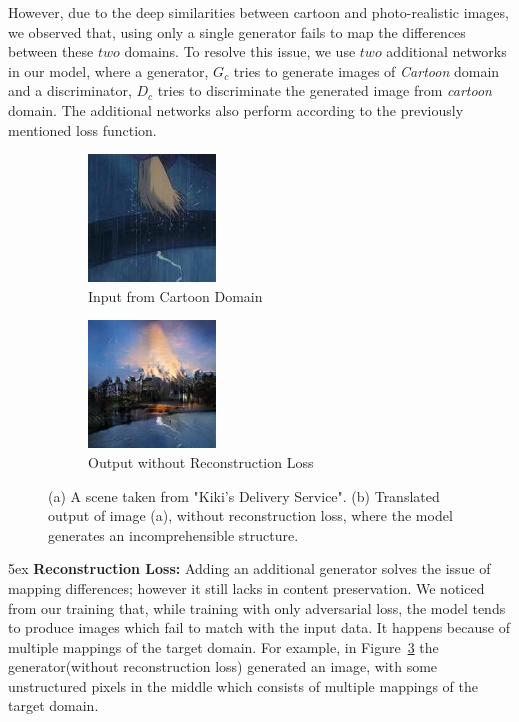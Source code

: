 \documentclass[conference]{IEEEtran}
\begin{document}
However, due to the deep similarities between cartoon and photo-realistic images, we observed that, using only a single generator fails to map the differences between these $two$ domains. To resolve this issue, we use $two$ additional networks in our model, where a generator, $G_c$ tries to generate images of \textit{Cartoon} domain and a discriminator, $D_c$ tries to discriminate the generated image from \textit{cartoon} domain. The additional networks also perform according to the previously mentioned loss function.\\ %
\begin{figure}[!htb]
    \centering
    \begin{subfigure}[b]{0.2\textwidth}
        \centering
        \includegraphics[scale=0.7]{Intro_pic/kds_real.png}
        \caption{Input from Cartoon Domain}
        \label{subfig: rc_1}
    \end{subfigure}
    \hspace{0.1in}
    \begin{subfigure}[b]{0.2\textwidth}
        \centering
        \includegraphics[scale=0.7]{Intro_pic/kds_fake.png}
        \caption{Output without Reconstruction Loss}
        \label{subfig:rc_2}
    \end{subfigure}
    \caption{(a) A scene taken from "Kiki's Delivery Service". (b) Translated output of image (a), without reconstruction loss, where the model generates an incomprehensible structure.}
    \label{fig:rc_loss}
\end{figure}

\parindent 5ex \textbf{Reconstruction Loss:} Adding an additional generator solves the issue of mapping differences; however it still lacks in content preservation. We noticed from our training that, while training with only adversarial loss, the model tends to produce images which fail to match with the input data. It happens because of multiple mappings of the target domain. For example, in Figure~\ref{fig:rc_loss} the generator(without reconstruction loss) generated an image, with some unstructured pixels in the middle which consists of multiple mappings of the target domain.
\end{document}
